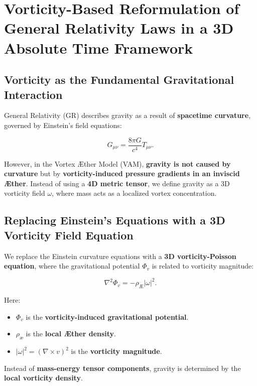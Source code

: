 \section*{Vorticity-Based Reformulation of General Relativity Laws in a 3D Absolute Time Framework}

\subsection*{Vorticity as the Fundamental Gravitational Interaction}

General Relativity (GR) describes gravity as a result of \textbf{spacetime curvature}, governed by Einstein's field equations:

\begin{equation*}
    G_{\mu\nu} = \frac{8\pi G}{c^4} T_{\mu\nu}.
\end{equation*}

However, in the Vortex Æther Model (VAM), \textbf{gravity is not caused by curvature} but by \textbf{vorticity-induced pressure gradients in an inviscid Æther}. Instead of using a \textbf{4D metric tensor}, we define gravity as a 3D vorticity field \( \omega \), where mass acts as a localized vortex concentration.

\subsection*{Replacing Einstein's Equations with a 3D Vorticity Field Equation}

We replace the Einstein curvature equations with a \textbf{3D vorticity-Poisson equation}, where the gravitational potential \( \Phi_v \) is related to vorticity magnitude:

\begin{equation*}
    \nabla^2 \Phi_v = - \rho_\text{Æ} |\omega|^2.
\end{equation*}

Here:
\begin{itemize}
    \item  \( \Phi_v \) is the \textbf{vorticity-induced gravitational potential}.
    \item  \( \rho_\text{\ae} \) is the \textbf{local Æther density}.
    \item  \( |\omega|^2 = (\nabla \times v)^2 \) is the \textbf{vorticity magnitude}.
\end{itemize}

Instead of \textbf{mass-energy tensor components}, gravity is determined by the \textbf{local vorticity density}.



